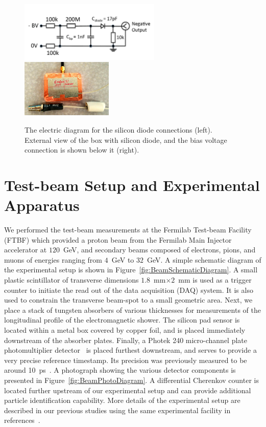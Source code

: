 \documentclass[12pt]{article}
\begin{document}
{\begin{figure}[htbp] 
\centering
\includegraphics[width=0.60\textwidth]{plots/SiliconDiodeDiagram.pdf} 
\includegraphics[width=0.39\textwidth]{plots/SiliconDiodeBox.jpg} 
\caption{The electric diagram for the silicon diode connections (left). External
view of the box with silicon diode, and the bias voltage connection is shown
below it (right).} 
\label{fig:SiliconPad} 
\end{figure} 


\section{Test-beam Setup and Experimental Apparatus }
\label{sec:tbeam}


We performed the test-beam measurements at the Fermilab Test-beam Facility
(FTBF) which provided a proton beam from the Fermilab Main Injector accelerator
at $120$~GeV, and secondary beams composed of electrons, pions, and muons of
energies ranging from $4$~GeV to $32$~GeV. A simple schematic diagram of the
experimental setup is shown in Figure~\ref{fig:BeamSchematicDiagram}. A small
plastic scintillator of transverse dimensions $1.8$~mm$\times 2$~mm is used as a
trigger counter to initiate the read out of the data acquisition (DAQ) system.
It is also used to constrain the transverse beam-spot to a small geometric area.
Next, we place a stack of tungsten absorbers of various thicknesses for
measurements of the longitudinal profile of the electromagnetic shower. The
silicon pad sensor is located within a metal box covered by copper foil, and is
placed immediately downstream of the absorber plates. Finally, a Photek 240
micro-channel plate photomultiplier detector~\cite{Anderson:2015gha,
MCPFastCaloNIMA, Ronzhin2015288,Ronzhin201552} is placed furthest downstream,
and serves to provide a very precise reference timestamp. Its precision was
previously measured to be around 10~ps~\cite{MCPShowerMaxPaper}. A photograph showing the various
detector components is presented in Figure~\ref{fig:BeamPhotoDiagram}. A
differential Cherenkov counter is located further upstream of our experimental
setup and can provide additional particle identification capability. More
details of the experimental setup are described in our previous studies using
the same experimental facility in references~\cite{Anderson:2015gha,
MCPFastCaloNIMA, Ronzhin2015288,Ronzhin201552}.

}
\end{document}
